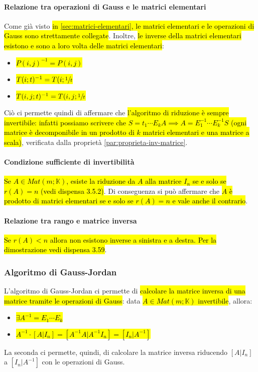 \paragraph{Relazione tra operazioni di Gauss e le matrici elementari} Come già
visto \hl{in {\ref{sec:matrici-elementari}}, le matrici elementari e le operazioni
di Gauss sono strettamente collegate}. Inoltre, \hl{le inverse della matrici elementari
esistono e sono a loro volta delle matrici elementari}:
\begin{itemize}
    \item \hl{$P(i,j)^{-1} = P(i,j)$}
    \item \hl{$T(i;t)^{-1} = T(i; \sfrac{1}{t}$}
    \item \hl{$T(i,j;t)^{-1} = T(i,j; \sfrac{1}{t}$}
\end{itemize}
Ciò ci permette quindi di affermare che \hl{l'algoritmo di riduzione è sempre invertibile:
infatti possiamo scrivere che $S = t_1 \dotsm E_kA \implies A = E^{-1}_1 \dotsm E^{-1}_kS$
(ogni matrice è decomponibile in un prodotto di $k$ matrici elementari e una
matrice a scala)}, verificata dalla proprietà {\ref{par:proprieta-inv-matrice}}.

\paragraph{Condizione sufficiente di invertibilità} \hl{Se $A \in Mat(m;\mathbb{K})$,
esiste la riduzione da $A$ alla matrice $I_n$ se e solo se $r(A)=n$ 
(vedi dispensa 3.5.2)}. Di conseguenza si può affermare che \hl{$A$ è prodotto di 
matrici elementari se e solo se $r(A)=n$ e vale anche il contrario}.

\paragraph{Relazione tra rango e matrice inversa} \hl{Se $r(A)<n$ allora non esistono
inverse a sinistra e a destra. Per la dimostrazione vedi dispensa 3.59}.

\subsubsection{Algoritmo di Gauss-Jordan}
L'algoritmo di Gauss-Jordan ci permette di \hl{calcolare la matrice inversa di una
matrice tramite le operazioni di Gauss}: data \hl{$A \in Mat(m; \mathbb{K})$ 
invertibile}, allora:
\begin{itemize}
    \item \hl{$\exists A^{-1} = E_1 \dotsm E_k$}
    \item \hl{$A^{-1} \cdot [A|I_n] = [A^{-1}A|A^{-1}I_n] = [I_n|A^{-1}]$}
\end{itemize}
La seconda ci permette, quindi, di calcolare la matrice inversa riducendo $[A|I_n]$
a $[I_n|A^{-1}]$ con le operazioni di Gauss.
